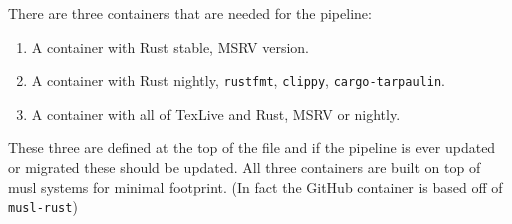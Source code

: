 There are three containers that are needed for the pipeline:

\begin{enumerate}
  \item A container with Rust stable, MSRV version.
  \item A container with Rust nightly, \texttt{rustfmt}, \texttt{clippy}, \texttt{cargo-tarpaulin}.
  \item A container with all of TexLive and Rust, MSRV or nightly.
\end{enumerate}

These three are defined at the top of the file and if the pipeline is ever updated
or migrated these should be updated. All three containers are built on top of
musl systems for minimal footprint. (In fact the GitHub container is based off of \texttt{musl-rust})
